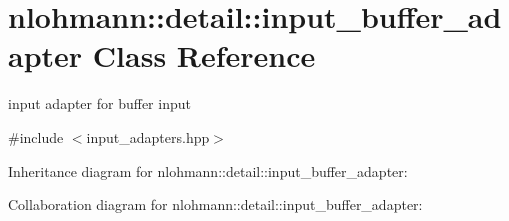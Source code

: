 \hypertarget{classnlohmann_1_1detail_1_1input__buffer__adapter}{}\section{nlohmann\+:\+:detail\+:\+:input\+\_\+buffer\+\_\+adapter Class Reference}
\label{classnlohmann_1_1detail_1_1input__buffer__adapter}


input adapter for buffer input  




{\ttfamily \#include $<$input\+\_\+adapters.\+hpp$>$}



Inheritance diagram for nlohmann\+:\+:detail\+:\+:input\+\_\+buffer\+\_\+adapter\+:


Collaboration diagram for nlohmann\+:\+:detail\+:\+:input\+\_\+buffer\+\_\+adapter\+:
